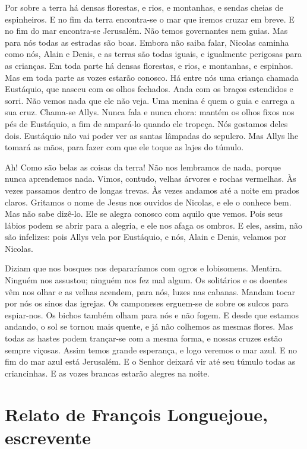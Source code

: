 Por sobre a terra há densas florestas, e rios, e montanhas, e sendas cheias
de espinheiros. E no fim da terra encontra-se o mar que iremos cruzar em
breve. E no fim do mar encontra-se Jerusalém. Não temos governantes nem
guias. Mas para nós todas as estradas são boas. Embora não saiba falar,
Nicolas caminha como nós, Alain e Denis, e as terras são todas iguais, e
igualmente perigosas para as crianças. Em toda parte há densas florestas,
e rios, e montanhas, e espinhos. Mas em toda parte as vozes estarão
conosco. Há entre nós uma criança chamada Eustáquio, que nasceu com os
olhos fechados. Anda com os braços estendidos e sorri. Não vemos nada que
ele não veja. Uma menina é quem o guia e carrega a sua cruz. Chama-se
Allys. Nunca fala e nunca chora: mantém os olhos fixos nos pés de
Eustáquio, a fim de ampará-lo quando ele tropeça. Nós gostamos deles dois.
Eustáquio não vai poder ver as santas lâmpadas do sepulcro. Mas Allys lhe
tomará as mãos, para fazer com que ele toque as lajes do túmulo.

Ah! Como são belas as coisas da terra! Não nos lembramos de nada, porque
nunca aprendemos nada. Vimos, contudo, velhas árvores e rochas vermelhas.
Às vezes passamos dentro de longas trevas. Às vezes andamos até a noite em
prados claros. Gritamos o nome de Jesus nos ouvidos de Nicolas, e ele o
conhece bem. Mas não sabe dizê-lo. Ele se alegra conosco com aquilo que
vemos. Pois seus lábios podem se abrir para a alegria, e ele nos afaga os
ombros. E eles, assim, não são infelizes: pois Allys vela por Eustáquio, e
nós, Alain e Denis, velamos por Nicolas.

Diziam que nos bosques nos depararíamos com ogros e lobisomens. Mentira.
Ninguém nos assustou; ninguém nos fez mal algum. Os solitários e os
doentes vêm nos olhar e as velhas acendem, para nós, luzes nas cabanas.
Mandam tocar por nós os sinos das igrejas. Os camponeses erguem-se de
sobre os sulcos para espiar-nos. Os bichos também olham para nós e não
fogem. E desde que estamos andando, o sol se tornou mais quente, e já não
colhemos as mesmas flores. Mas todas as hastes podem trançar-se com a
mesma forma, e nossas cruzes estão sempre viçosas. Assim temos grande
esperança, e logo veremos o mar azul. E no fim do mar azul está Jerusalém.
E o Senhor deixará vir até seu túmulo todas as criancinhas. E as vozes
brancas estarão alegres na noite.

\chapter{Relato de François Longuejoue, escrevente}

